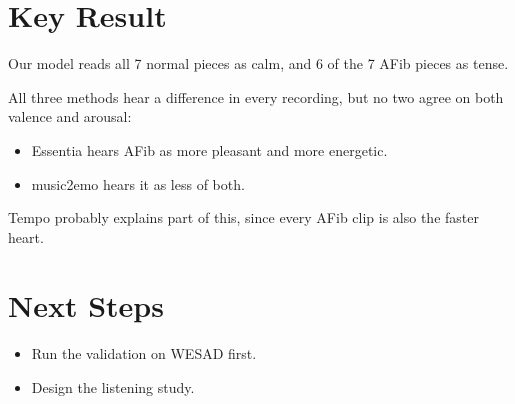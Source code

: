 \documentclass[11pt,a4paper]{article}
\begin{document}
\section{Key Result}
Our model reads all 7 normal pieces as calm, and 6 of the 7 AFib pieces as tense.

All three methods hear a difference in every recording, but no two agree on both valence and
arousal:
\begin{itemize}
  \item Essentia hears AFib as more pleasant and more energetic.
  \item music2emo hears it as less of both.
\end{itemize}
Tempo probably explains part of this, since every AFib clip is also the faster heart.

\section{Next Steps}
\begin{itemize}
  \item Run the validation on WESAD first.
  \item Design the listening study.
\end{itemize}
\end{document}
